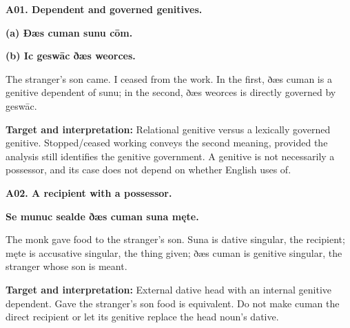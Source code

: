 \par\begin{minipage}{\linewidth}\raggedright
\textbf{A01. Dependent and governed genitives.}

\textbf{(a) Ðæs cuman sunu cōm.}

\textbf{(b) Ic geswāc ðæs weorces.}

The stranger’s son came. I ceased from the work. In the first, ðæs cuman is a genitive dependent of sunu; in the second, ðæs weorces is directly governed by geswāc.

\textbf{Target and interpretation:} Relational genitive versus a lexically governed genitive. Stopped/\allowbreak{}ceased working conveys the second meaning, provided the analysis still identifies the genitive government. A genitive is not necessarily a possessor, and its case does not depend on whether English uses of.

\end{minipage}\par\addvspace{4pt}

\par\begin{minipage}{\linewidth}\raggedright
\textbf{A02. A recipient with a possessor.}

\textbf{Se munuc sealde ðæs cuman suna męte.}

The monk gave food to the stranger’s son. Suna is dative singular, the recipient; męte is accusative singular, the thing given; ðæs cuman is genitive singular, the stranger whose son is meant.

\textbf{Target and interpretation:} External dative head with an internal genitive dependent. Gave the stranger’s son food is equivalent. Do not make cuman the direct recipient or let its genitive replace the head noun’s dative.

\end{minipage}\par\addvspace{4pt}

